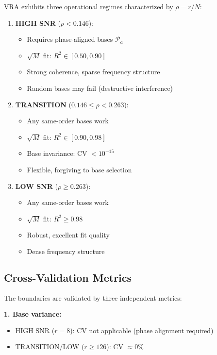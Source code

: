 \begin{theorem}
\label{thm:regime_map}
VRA exhibits three operational regimes characterized by $\rho = r/N$:

\begin{enumerate}
    \item \textbf{HIGH SNR} ($\rho < 0.146$):
    \begin{itemize}
        \item Requires phase-aligned bases $\mathcal{P}_a$
        \item $\sqrt{M}$ fit: $R^2 \in [0.50, 0.90]$
        \item Strong coherence, sparse frequency structure
        \item Random bases may fail (destructive interference)
    \end{itemize}

    \item \textbf{TRANSITION} ($0.146 \leq \rho < 0.263$):
    \begin{itemize}
        \item Any same-order bases work
        \item $\sqrt{M}$ fit: $R^2 \in [0.90, 0.98]$
        \item Base invariance: CV $< 10^{-15}$
        \item Flexible, forgiving to base selection
    \end{itemize}

    \item \textbf{LOW SNR} ($\rho \geq 0.263$):
    \begin{itemize}
        \item Any same-order bases work
        \item $\sqrt{M}$ fit: $R^2 \geq 0.98$
        \item Robust, excellent fit quality
        \item Dense frequency structure
    \end{itemize}
\end{enumerate}
\end{theorem}

\subsection{Cross-Validation Metrics}

The boundaries are validated by three independent metrics:

\textbf{1. Base variance:}
\begin{itemize}
    \item HIGH SNR ($r=8$): CV not applicable (phase alignment required)
    \item TRANSITION/LOW ($r \geq 126$): CV $\approx 0\%$
\end{itemize}

